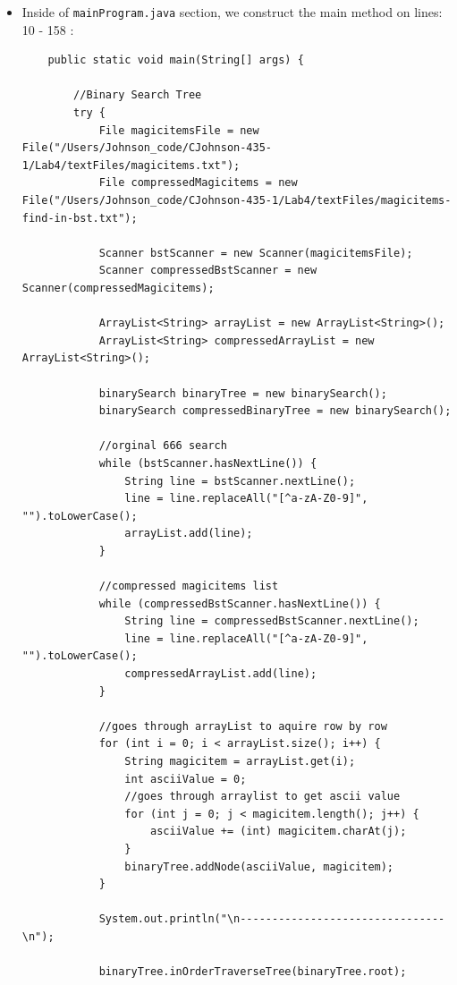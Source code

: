 \documentclass{article}
\begin{document}
\begin{itemize}
\item Inside of \verb|mainProgram.java| section, we construct the main method on lines: 10 - 158 :

\begin{verbatim}
    public static void main(String[] args) {

        //Binary Search Tree 
        try {
            File magicitemsFile = new File("/Users/Johnson_code/CJohnson-435-1/Lab4/textFiles/magicitems.txt");
            File compressedMagicitems = new File("/Users/Johnson_code/CJohnson-435-1/Lab4/textFiles/magicitems-find-in-bst.txt");
        
            Scanner bstScanner = new Scanner(magicitemsFile);
            Scanner compressedBstScanner = new Scanner(compressedMagicitems);
            
            ArrayList<String> arrayList = new ArrayList<String>();
            ArrayList<String> compressedArrayList = new ArrayList<String>();
        
            binarySearch binaryTree = new binarySearch();
            binarySearch compressedBinaryTree = new binarySearch();
            
            //orginal 666 search
            while (bstScanner.hasNextLine()) {
                String line = bstScanner.nextLine();
                line = line.replaceAll("[^a-zA-Z0-9]", "").toLowerCase();
                arrayList.add(line);
            }
        
            //compressed magicitems list
            while (compressedBstScanner.hasNextLine()) {
                String line = compressedBstScanner.nextLine();
                line = line.replaceAll("[^a-zA-Z0-9]", "").toLowerCase();
                compressedArrayList.add(line);
            }
        
            //goes through arrayList to aquire row by row
            for (int i = 0; i < arrayList.size(); i++) {
                String magicitem = arrayList.get(i);
                int asciiValue = 0;
                //goes through arraylist to get ascii value
                for (int j = 0; j < magicitem.length(); j++) {
                    asciiValue += (int) magicitem.charAt(j);
                }
                binaryTree.addNode(asciiValue, magicitem);
            }
        
            System.out.println("\n--------------------------------\n");
        
            binaryTree.inOrderTraverseTree(binaryTree.root);
        

\end{verbatim}
\end{itemize}
\end{document}
